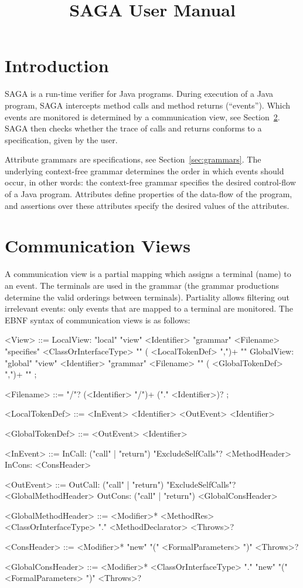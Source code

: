 \documentclass{article}
\begin{document}
\title{SAGA User Manual}
\date{}

\maketitle

\section{Introduction}
SAGA is a run-time verifier for Java programs.  During execution of a Java program, SAGA intercepts method calls and method returns (``events'').  Which events are monitored is determined by a communication view, see Section~\ref{sec:views}. SAGA then checks whether the trace of calls and returns conforms to a specification, given by the user.

Attribute grammars are specifications, see Section~\ref{sec:grammars}.  The underlying context-free grammar determines the order in which events should occur,  in other words: the context-free grammar specifies the desired control-flow of a Java program.  Attributes define properties of the data-flow of the program,  and assertions over these attributes specify the desired values of the attributes.

\section{Communication Views}
\label{sec:views}
A communication view is a partial mapping which assigns a terminal (name) to an event. The terminals are used in the grammar (the grammar productions determine the valid orderings between terminals).  Partiality allows filtering out irrelevant events: only events that are mapped to a terminal are monitored.  The EBNF syntax of communication views is as follows:


\begin{grammar}
<View> ::=  LocalView: "local" "view" <Identifier> "grammar" <Filename> "specifies" <ClassOrInterfaceType> "{" (  <LocalTokenDef> ",")+ "}"
\alt GlobalView: "global" "view" <Identifier> "grammar" <Filename>                                   "{" ( <GlobalTokenDef> ",")+ "}"
  ;

<Filename> ::= "/"? (<Identifier> "/")+ ("." <Identifier>)?
  ;

<LocalTokenDef> ::=  <InEvent> <Identifier>
\alt <OutEvent> <Identifier>

<GlobalTokenDef> ::= <OutEvent> <Identifier>

<InEvent> ::= InCall: ("call" | "return") "ExcludeSelfCalls"? <MethodHeader>
\alt  InCons: <ConsHeader>

<OutEvent> ::= OutCall: ("call" | "return") "ExcludeSelfCalls"? <GlobalMethodHeader>
\alt OutCons: ("call" | "return") <GlobalConsHeader>
  
<GlobalMethodHeader> ::= <Modifier>* <MethodRes> <ClassOrInterfaceType> "." <MethodDeclarator> <Throws>?
  
<ConsHeader> ::= <Modifier>* "new" "(" <FormalParameters> ")" <Throws>?
  
<GlobalConsHeader> ::= <Modifier>* <ClassOrInterfaceType> "." "new" "(" <FormalParameters> ")" <Throws>?
\end{grammar}
\end{document}
